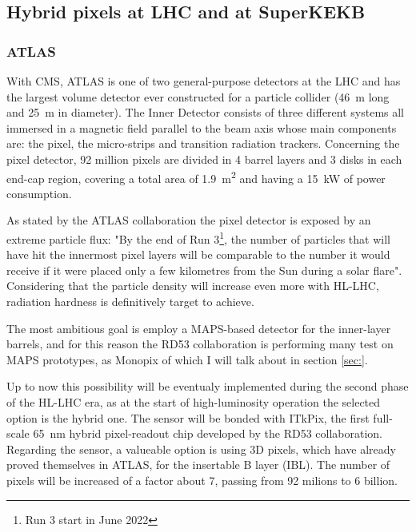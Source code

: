     \subsection{Hybrid pixels at LHC and at SuperKEKB}
        \subsubsection{ATLAS}    
        With CMS, ATLAS is one of two general-purpose detectors at the LHC and has the largest volume detector ever constructed for a particle
        collider (\SI{46}{m} long and \SI{25}{m} in diameter).  
        The Inner Detector consists of three different systems all immersed in a magnetic field parallel to the beam axis whose main components are: the pixel, the micro-strips and transition radiation trackers. Concerning the pixel detector, 92 million pixels are divided in 4 barrel layers and 3 disks in each end-cap region, covering a total area of \SI{1.9}{m\squared} and having a \SI{15}{kW} of power consumption.

        As stated by the ATLAS collaboration the pixel detector is exposed by an extreme particle flux: "By the end of Run 3\footnote{Run 3 start in June 2022}, the number of particles that will have hit the innermost pixel layers will be comparable to the number it would receive if it were placed only a few kilometres from the Sun during a solar flare". Considering that the particle density will increase even more with HL-LHC, radiation hardness is definitively target to achieve. 

        The most ambitious goal is employ a MAPS-based detector for the inner-layer barrels, and for this reason the RD53 collaboration is performing many test on MAPS prototypes, as Monopix of which I will talk about in section \ref{sec:}.
        
        Up to now this possibility will be eventualy implemented during the second phase of the HL-LHC era, as at the start of high-luminosity operation the selected option is the hybrid one. The sensor will be bonded with ITkPix, the first full-scale \SI{65}{nm} hybrid pixel-readout chip developed by the RD53 collaboration.
        Regarding the sensor, a valueable option is using 3D pixels, which have already proved themselves in ATLAS, for the insertable B layer (IBL).
        The number of pixels will be increased of a factor about 7, passing from 92 milions to 6 billion.
    

